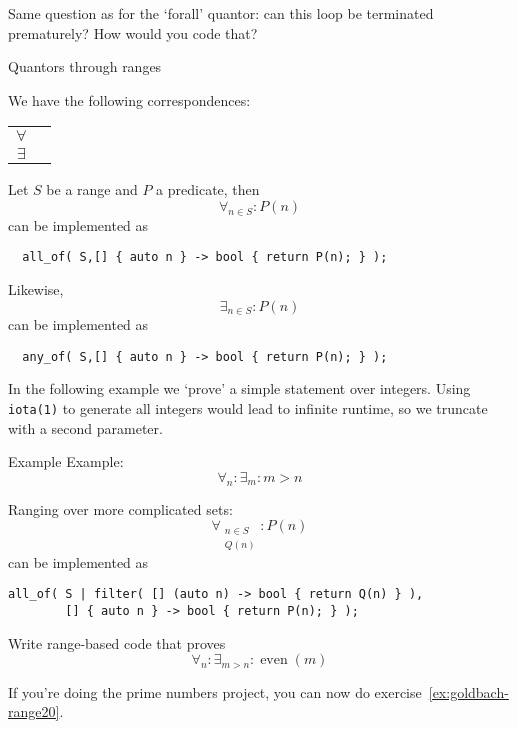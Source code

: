 \begin{exercise}
  Same question as for the `forall' quantor:
  can this loop be terminated prematurely?
  How would you code that?
\end{exercise}

 {Quantors through ranges}

We have the following correspondences:

  \begin{tabular}{cc}
    $\forall$&\n{all_of}\\ 
    $\exists$&\n{any_of}
  \end{tabular}

Let $S$ be a range and $P$ a predicate, then
\[ \forall_{n\in S}\colon P(n) \]
can be implemented as
\begin{lstlisting}
  all_of( S,[] { auto n } -> bool { return P(n); } );
\end{lstlisting}
Likewise,
\[ \exists_{n\in S}\colon P(n) \]
can be implemented as
\begin{lstlisting}
  any_of( S,[] { auto n } -> bool { return P(n); } );
\end{lstlisting}

In the following example we `prove' a simple statement over integers.
Using \lstinline+iota(1)+ to generate all integers
would lead to infinite runtime, so we truncate with a second parameter.

\begin{block}{Example}
  \label{sl:forall-n-greater}
  Example: \[ \forall_n\colon\exists_m\colon m>n \]
\end{block}

Ranging over more complicated sets:
\[ \forall_{\scriptstyle \begin{array}{cc}n\in S \\ Q(n)\end{array}}\colon P(n) \]
can be implemented as
\begin{lstlisting}
all_of( S | filter( [] (auto n) -> bool { return Q(n) } ),
        [] { auto n } -> bool { return P(n); } );
\end{lstlisting}

\begin{exercise}
  \label{ex:forall-n-greater-even}
  Write range-based code that proves
  \[ \forall_n\colon \exists_{m>n}\colon \mathop{\mathrm{even}}(m) \]
\end{exercise}

If you're doing the prime numbers project,
you can now do exercise~\ref{ex:goldbach-range20}.


